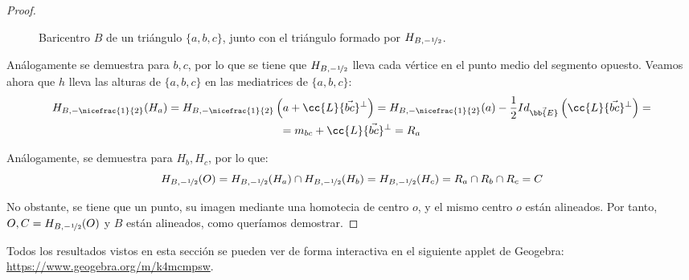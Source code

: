\begin{proof}
\begin{figure}[H]
        \caption{\centering Baricentro $B$ de un triángulo $\{a,b,c\}$, junto con el triángulo formado por $H_{B,-\nicefrac{1}{2}}$.}
    \end{figure}
    Análogamente se demuestra para $b,c$, por lo que se tiene que $H_{B,-\nicefrac{1}{2}}$ lleva cada vértice en el punto medio del segmento opuesto. Veamos ahora que $h$ lleva las alturas de $\{a,b,c\}$ en las mediatrices de $\{a,b,c\}$:
    \begin{multline*}
        H_{B,-\nicefrac{1}{2}}(H_a) = H_{B,-\nicefrac{1}{2}}\left(a + \cc{L}\{\vec{bc}\}^\perp\right)
        = H_{B,-\nicefrac{1}{2}}(a) -\frac{1}{2}Id_{\vec{\bb{E}}}\left(\cc{L}\{\vec{bc}\}^\perp\right) =\\= m_{bc} + \cc{L}\{\vec{bc}\}^\perp= R_a
    \end{multline*}
    
    Análogamente, se demuestra para $H_b, H_c$, por lo que:
    \begin{equation*}
        H_{B,-\nicefrac{1}{2}}(O) = H_{B,-\nicefrac{1}{2}}(H_a) \cap H_{B,-\nicefrac{1}{2}}(H_b) = H_{B,-\nicefrac{1}{2}}(H_c) = R_a\cap R_b \cap R_c = C
    \end{equation*}
    
    No obstante, se tiene que un punto, su imagen mediante una homotecia de centro $o$, y el mismo centro $o$ están alineados. Por tanto, $O, C=H_{B,-\nicefrac{1}{2}}(O)$ y $B$ están alineados, como queríamos demostrar.
\end{proof}


\begin{observacion}
    Todos los resultados vistos en esta sección se pueden ver de forma interactiva en el siguiente applet de Geogebra: \href{https://www.geogebra.org/m/k4mcmpsw}{https://www.geogebra.org/m/k4mcmpsw}.
\end{observacion}


